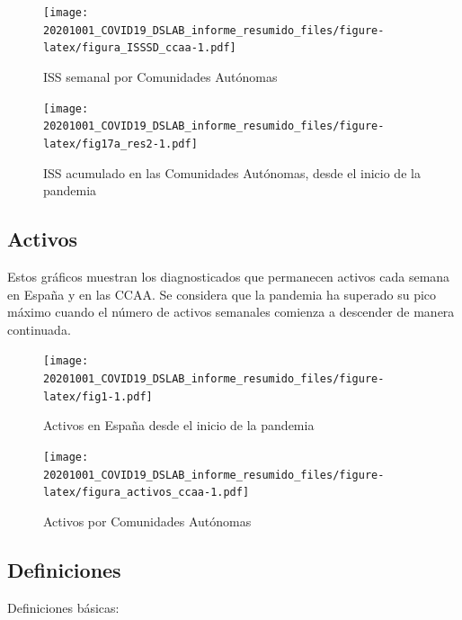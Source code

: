 \documentclass[
  11pt,
]{article}
\begin{document}
\begin{figure}
\centering
\texttt{[image: 20201001\_COVID19\_DSLAB\_informe\_resumido\_files/figure-latex/figura\_ISSSD\_ccaa-1.pdf]}
\caption{\label{fig:figura_ISSSD_ccaa} ISS semanal por Comunidades
Autónomas}
\end{figure}

\vspace{0.2cm}

\begin{figure}
\centering
\texttt{[image: 20201001\_COVID19\_DSLAB\_informe\_resumido\_files/figure-latex/fig17a\_res2-1.pdf]}
\caption{\label{fig:fig17a_res} ISS acumulado en las Comunidades
Autónomas, desde el inicio de la pandemia}
\end{figure}

\clearpage

\hypertarget{activos}{%
\subsection{Activos}\label{activos}}

Estos gráficos muestran los diagnosticados que permanecen activos cada
semana en España y en las CCAA. Se considera que la pandemia ha superado
su pico máximo cuando el número de activos semanales comienza a
descender de manera continuada.

\vspace{0.2cm}

\begin{figure}
\centering
\texttt{[image: 20201001\_COVID19\_DSLAB\_informe\_resumido\_files/figure-latex/fig1-1.pdf]}
\caption{\label{fig:fig17a_res} Activos en España desde el inicio de la
pandemia}
\end{figure}

\begin{figure}
\centering
\texttt{[image: 20201001\_COVID19\_DSLAB\_informe\_resumido\_files/figure-latex/figura\_activos\_ccaa-1.pdf]}
\caption{\label{fig:figura_activos_ccaa} Activos por Comunidades
Autónomas}
\end{figure}

\clearpage

\hypertarget{definiciones}{%
\subsection{Definiciones}\label{definiciones}}

Definiciones básicas:
\end{document}
